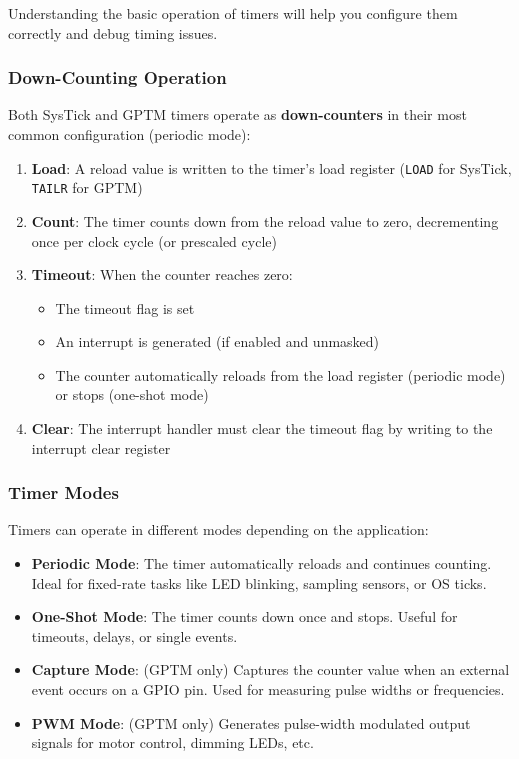 Understanding the basic operation of timers will help you configure them correctly and debug timing issues.

\subsubsection{Down-Counting Operation}

Both SysTick and GPTM timers operate as \textbf{down-counters} in their most common configuration (periodic mode):

\begin{enumerate}[nosep]
  \item \textbf{Load}: A reload value is written to the timer's load register (\texttt{LOAD} for SysTick, \texttt{TAILR} for GPTM)
  \item \textbf{Count}: The timer counts down from the reload value to zero, decrementing once per clock cycle (or prescaled cycle)
  \item \textbf{Timeout}: When the counter reaches zero:
    \begin{itemize}[nosep]
      \item The timeout flag is set
      \item An interrupt is generated (if enabled and unmasked)
      \item The counter automatically reloads from the load register (periodic mode) or stops (one-shot mode)
    \end{itemize}
  \item \textbf{Clear}: The interrupt handler must clear the timeout flag by writing to the interrupt clear register
\end{enumerate}

\subsubsection{Timer Modes}

Timers can operate in different modes depending on the application:

\begin{itemize}[nosep]
  \item \textbf{Periodic Mode}: The timer automatically reloads and continues counting. Ideal for fixed-rate tasks like LED blinking, sampling sensors, or OS ticks.
  \item \textbf{One-Shot Mode}: The timer counts down once and stops. Useful for timeouts, delays, or single events.
  \item \textbf{Capture Mode}: (GPTM only) Captures the counter value when an external event occurs on a GPIO pin. Used for measuring pulse widths or frequencies.
  \item \textbf{PWM Mode}: (GPTM only) Generates pulse-width modulated output signals for motor control, dimming LEDs, etc.
\end{itemize}

